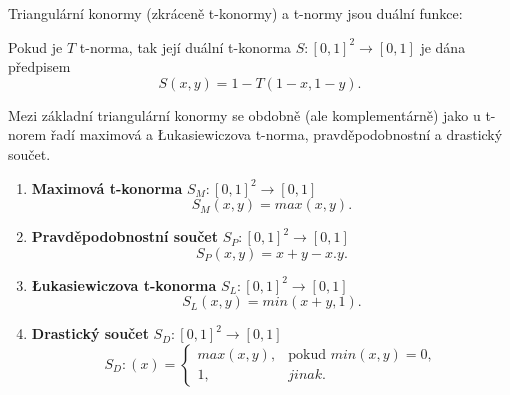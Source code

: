 Triangulární konormy (zkráceně t-konormy) a t-normy jsou du\'aln\'i funkce:

\begin{sentence}
    \cite{Springer}
    Pokud je $T$ t-norma, tak její duální t-konorma $S: [0,1]^2 \rightarrow [0,1]$ je dána předpisem $$S(x,y) = 1 - T(1-x, 1-y).$$
\end{sentence}


Mezi základní triangulární konormy se obdobně (ale komplementárně) jako u t-norem řadí maximová a Łukasiewiczova t-norma, pravděpodobnostní a drastický součet.
\begin{example}
\cite{Springer}
    \begin{enumerate}
    \item \textbf{Maximová t-konorma} $S_M: [0,1]^2 \rightarrow [0,1]$
    $$S_M(x,y) = max(x,y).$$
    \item \textbf{Pravděpodobnostní součet} $S_P: [0,1]^2 \rightarrow [0,1]$
    $$S_P(x,y) = x+y-x.y.$$
    \item \textbf{Łukasiewiczova t-konorma} $S_L: [0,1]^2 \rightarrow [0,1]$
    $$S_L(x,y) = min(x+y,1).$$
    \item \textbf{Drastický součet} $S_D: [0,1]^2 \rightarrow [0,1]$
    $$S_D:(x)=\begin{cases} max(x,y), & \mbox{pokud  }  min(x,y) = 0,\\ 
    1, &  jinak.  \end{cases}$$
\end{enumerate}
\end{example}

